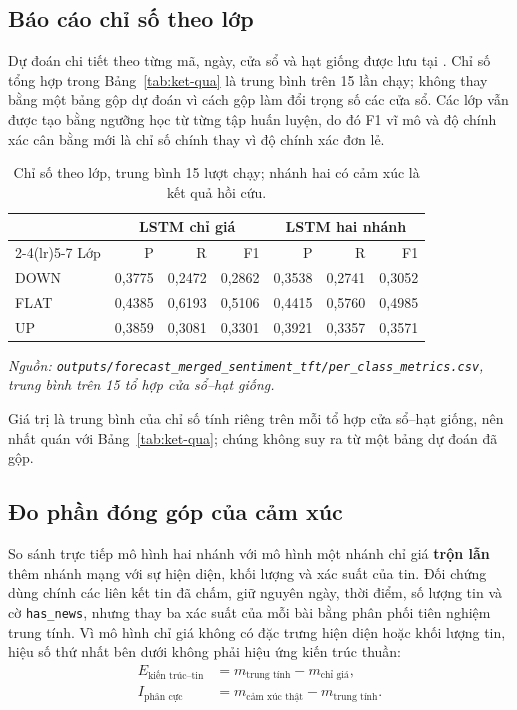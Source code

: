 \subsection{Báo cáo chỉ số theo lớp}

Dự đoán chi tiết theo từng mã, ngày, cửa sổ và hạt giống được lưu tại
. Chỉ số tổng hợp
trong Bảng~\ref{tab:ket-qua} là trung bình trên 15 lần chạy; không thay bằng một bảng
gộp dự đoán vì cách gộp làm đổi trọng số các cửa sổ. Các lớp vẫn được tạo bằng ngưỡng học
từ từng tập huấn luyện, do đó F1 vĩ mô và độ chính xác cân bằng mới là chỉ số chính thay
vì độ chính xác đơn lẻ.

\begin{table}[H]
  \centering
  \small
  \caption{Chỉ số theo lớp, trung bình 15 lượt chạy; nhánh hai có cảm xúc là kết quả hồi cứu.}
  \label{tab:kq-theo-lop}
  \begin{tabular}{l rrr rrr}
    \toprule
    & \multicolumn{3}{c}{LSTM chỉ giá} & \multicolumn{3}{c}{LSTM hai nhánh} \\
    \cmidrule(lr){2-4}\cmidrule(lr){5-7}
    Lớp & P & R & F1 & P & R & F1 \\
    \midrule
    DOWN & 0,3775 & 0,2472 & 0,2862 & 0,3538 & 0,2741 & 0,3052 \\
    FLAT & 0,4385 & 0,6193 & 0,5106 & 0,4415 & 0,5760 & 0,4985 \\
    UP   & 0,3859 & 0,3081 & 0,3301 & 0,3921 & 0,3357 & 0,3571 \\
    \bottomrule
  \end{tabular}
\end{table}
\noindent\textit{Nguồn: \texttt{outputs/forecast\_merged\_sentiment\_tft/per\_class\_metrics.csv}, trung bình trên 15 tổ hợp cửa sổ--hạt giống.}

Giá trị là trung bình của chỉ số tính riêng trên mỗi tổ hợp cửa sổ--hạt giống,
nên nhất quán với Bảng~\ref{tab:ket-qua}; chúng không suy ra từ một bảng dự đoán
đã gộp.

\subsection{Đo phần đóng góp của cảm xúc}
\label{sec:kq-donggop}

So sánh trực tiếp mô hình hai nhánh với mô hình một nhánh chỉ giá \textbf{trộn lẫn} thêm
nhánh mạng với sự hiện diện, khối lượng và xác suất của tin. Đối chứng dùng chính các liên
kết tin đã chấm, giữ nguyên ngày, thời điểm, số lượng tin và cờ \texttt{has\_news}, nhưng
thay ba xác suất của mỗi bài bằng phân phối tiên nghiệm trung tính. Vì mô hình chỉ giá
không có đặc trưng hiện diện hoặc khối lượng tin, hiệu số thứ nhất bên dưới không phải hiệu
ứng kiến trúc thuần:
\begin{align}
  E_{\text{kiến trúc--tin}} &= m_{\text{trung tính}} - m_{\text{chỉ giá}}, \\
  I_{\text{phân cực}} &= m_{\text{cảm xúc thật}} - m_{\text{trung tính}}.
\end{align}

